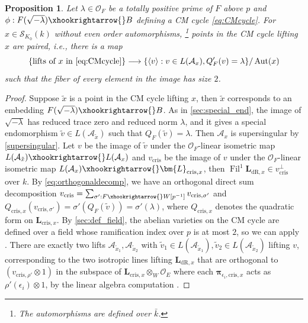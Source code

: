 \documentclass{amsart}
\numberwithin{equation}{subsection}
\numberwithin{theorem}{section}
\newtheorem{proposition}[theorem]{Proposition}
\theoremstyle{definition}
\theoremstyle{remark}
\newcommand{\cA}{\mathcal{A}}
\newcommand{\cO}{\mathcal{O}}
\newcommand{\cris}{_{\mathrm{cris}}}
\DeclareMathOperator{\Aut}{Aut}
\DeclareMathOperator{\Fil}{Fil}
\begin{document}
\begin{proposition} \label{lem:pairwoaut}
    Let $\lambda \in \cO_F$ be a totally positive prime of $F$ above $p$ and $\phi: F(\sqrt{-\lambda}) \xhookrightarrow{}B$ defining a CM cycle \eqref{eq:CMcycle}. For $x\in \mathscr{S}_{K_0}(k)$ without even order automorphisms, \footnote{The automorphisms are defined over $\bar{k}$. } points in the CM cycle lifting $x$ are paired, i.e., there is a map $$\{\text{lifts of }x\text{ in } \eqref{eq:CMcycle}  \}\longrightarrow \{\langle v\rangle : v\in L(\cA_x), Q_F'(v) = \lambda\}/\Aut(x)$$ such that the fiber of every element in the image has size $2$. 
\end{proposition}
\begin{proof}
    Suppose $\tilde{x}$ is a point in the CM cycle lifting $x$, then $\tilde{x}$ corresponds to an embedding $F(\sqrt{-\lambda})\xhookrightarrow{}B$. As in \cref{sec:special_end}, the image of $\sqrt{-\lambda}$ has reduced trace zero and reduced norm $\lambda$, and it gives a special endomorphism $\tilde{v}\in L(\cA_{\tilde{x}})$ such that $Q_F(\tilde{v}) = \lambda$. Then $\cA_x$ is supersingular by \ref{supersingular}. Let $v$ be the image of $\tilde{v}$ under the $\cO_F$-linear isometric map $L(\cA_{\tilde{x}})\xhookrightarrow{}L(\cA_x)$ and $v\cris$ be the image of $v$ under the $\cO_F$-linear isometric map $L(\cA_{x})\xhookrightarrow{}\bm{L}_{\mathrm{cris},x}$, then $\Fil^1\bm{L}_{\mathrm{dR}, x}\in v\cris^{\perp}$ over $k$. By \eqref{eq:orthogonaldecomp}, we have an orthogonal direct sum decomposition $v\cris = \sum_{\sigma': F\xhookrightarrow{}W[p^{-1}]} v_{\mathrm{cris}, \sigma'}$ and $Q_{\mathrm{cris},x}(v_{\mathrm{cris},\sigma'})=\sigma' (Q_F(\tilde{v})) = \sigma'(\lambda)$, where $Q_{\mathrm{cris}, x}$ denotes the quadratic form on $\bm{L}_{\mathrm{cris},x}$. By \cref{sec:def_field}, the abelian varieties on the CM cycle are defined over a field whose ramification index over $p$ is at most $2$, so we can apply . There are exactly two lifts $\cA_{\tilde{x}_1}, \cA_{\tilde{x}_2}$ with $\tilde{v}_1\in L(\cA_{\tilde{x}_1}), \tilde{v}_2\in L(\cA_{\tilde{x}_2})$ lifting $v$, corresponding to the two isotropic lines lifting $\bm{L}_{\mathrm{dR},x}$ that are orthogonal to $(v_{\mathrm{cris},\rho'}\otimes 1)$ in the subspace of $\bm{L}_{\mathrm{cris},x}\otimes_W\cO_E$ where each $\bm{\pi}_{\epsilon_i, \mathrm{cris},x}$ acts as $\rho'(\epsilon_i)\otimes 1$, by the linear algebra computation . 
    

\end{proof}
\end{document}
